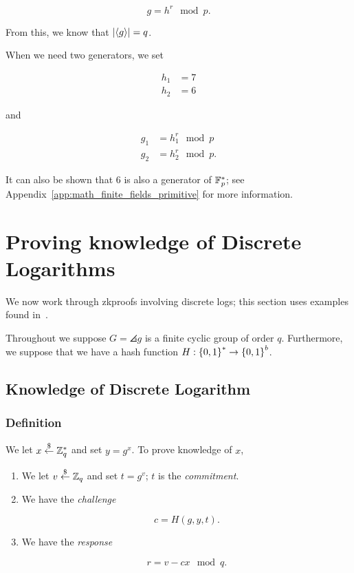 \begin{equation}
    g = h^{r} \mod p.
\end{equation}

\noindent
From this, we know that $\left| \left\langle g \right\rangle \right| = q$.

When we need two generators, we set

\begin{align}
    h_{1} &= 7 \nonumber\\
    h_{2} &= 6
\end{align}

\noindent
and

\begin{align}
    g_{1} &= h_{1}^{r} \mod p \nonumber\\
    g_{2} &= h_{2}^{r} \mod p.
\end{align}

\noindent
It can also be shown that $6$ is also a generator of $\mathbb{F}_{p}^{*}$;
see Appendix~\ref{app:math_finite_fields_primitive} for more information.



\section{Proving knowledge of Discrete Logarithms}

We now work through \glspl{zkproof} involving
\glspl{discrete log};
this section uses examples found in~\cite{GeneralDiscreteLogProofs}.

Throughout we suppose $G = \angles{g}$ is a \gls{finite cyclic group}
of order $q$.
Furthermore, we suppose that we have a \gls{hash function}
$H:\left\{ 0,1 \right\}^{*}\to\left\{ 0,1 \right\}^{b}$.

\subsection{Knowledge of Discrete Logarithm}

\subsubsection{Definition}

We let $x\stackrel{\$}{\leftarrow}{}\mathbb{Z}_{q}^{*}$ and set $y = g^{x}$.
To prove knowledge of $x$, 

\begin{enumerate}
\item We let $v\stackrel{\$}{\leftarrow}{}\mathbb{Z}_{q}$ and set $t = g^{v}$;
    $t$ is the \emph{commitment}.
\item We have the \emph{challenge}

\begin{equation}
    c = H(g,y,t).
\end{equation}

\item We have the \emph{response}

\begin{equation}
    r = v - cx \mod q.
\end{equation}
\end{enumerate}

